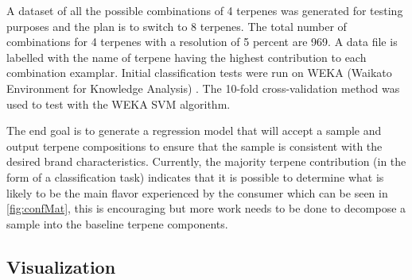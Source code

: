 \documentclass[12pt, a4paper]{article}
\begin{document}
A dataset of all the possible combinations of 4 terpenes was generated for testing purposes and the plan is to switch to 8 terpenes. The total number of combinations for 4 terpenes with a resolution of 5 percent are 969. A data file is labelled with the name of terpene having the highest contribution to each combination examplar. Initial classification tests were run on WEKA (Waikato Environment for Knowledge Analysis) \cite{hall2009}. The 10-fold cross-validation method was used to test with the WEKA SVM \cite{Cortes1995} algorithm.

The end goal is to generate a regression model that will accept a sample and output terpene compositions to ensure that the sample is consistent with the desired brand characteristics. Currently, the majority terpene contribution (in the form of a classification task) indicates that it is possible to determine what is likely to be the main flavor experienced by the consumer which can be seen in \ref{fig:confMat}, this is encouraging but more work needs to be done to decompose a sample into the baseline terpene components.

\subsection{Visualization}
\end{document}
